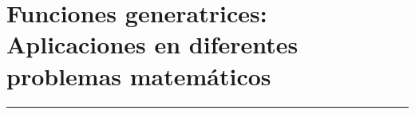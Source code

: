 \thispagestyle{portadapage}
\setcounter{subsection}{0}
\setcounter{subsubsection}{0}
\setcounter{actividad}{0}
\setcounter{actividad_previa}{0}
\setcounter{actividad_entre}{0}
\renewcommand{\articulotipo}{Taller}
\renewcommand{\articulotitulo}{Funciones generatrices: Aplicaciones en diferentes problemas matemáticos}
\renewcommand{\articulotitulocorto}{Funciones generatrices: Aplicaciones en diferentes problemas matemáticos}
\section{\articulotitulo}

\noindent\rule{\linewidth}{2pt}

\vspace{0.25cm}

\begin{flushright}
\end{flushright}

\vspace{0.5cm}

